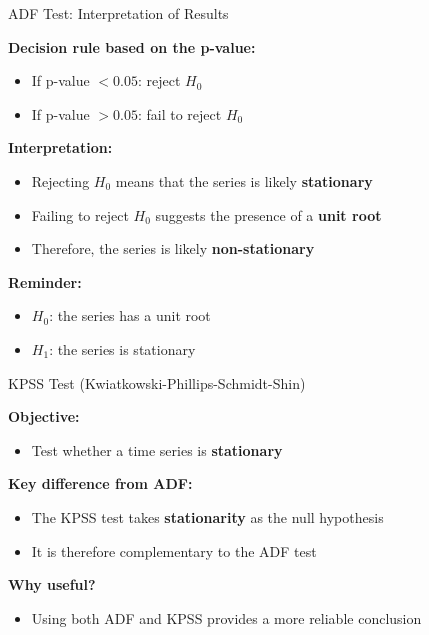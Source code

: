 \documentclass[aspectratio=169]{beamer}
\begin{document}
\begin{frame}{ADF Test: Interpretation of Results}

\textbf{Decision rule based on the p-value:}
\begin{itemize}
    \item If p-value $< 0.05$: reject $H_0$
    \item If p-value $> 0.05$: fail to reject $H_0$
\end{itemize}

\vspace{0.4cm}

\textbf{Interpretation:}
\begin{itemize}
    \item Rejecting $H_0$ means that the series is likely \textbf{stationary}
    \item Failing to reject $H_0$ suggests the presence of a \textbf{unit root}
    \item Therefore, the series is likely \textbf{non-stationary}
\end{itemize}

\vspace{0.4cm}

\textbf{Reminder:}
\begin{itemize}
    \item $H_0$: the series has a unit root
    \item $H_1$: the series is stationary
\end{itemize}

\end{frame}


\begin{frame}{KPSS Test (Kwiatkowski-Phillips-Schmidt-Shin)}

\textbf{Objective:}
\begin{itemize}
    \item Test whether a time series is \textbf{stationary}
\end{itemize}

\vspace{0.4cm}

\textbf{Key difference from ADF:}
\begin{itemize}
    \item The KPSS test takes \textbf{stationarity} as the null hypothesis
    \item It is therefore complementary to the ADF test
\end{itemize}

\vspace{0.4cm}

\textbf{Why useful?}
\begin{itemize}
    \item Using both ADF and KPSS provides a more reliable conclusion
\end{itemize}

\end{frame}
\end{document}
